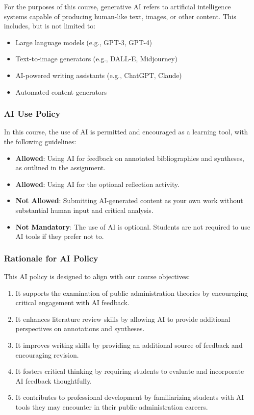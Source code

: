 \documentclass[12pt, letterpaper]{article}
\begin{document}
\noindent For the purposes of this course, generative AI refers to artificial intelligence systems capable of producing human-like text, images, or other content. This includes, but is not limited to:

\begin{itemize}
    \item Large language models (e.g., GPT-3, GPT-4)
    \item Text-to-image generators (e.g., DALL-E, Midjourney)
    \item AI-powered writing assistants (e.g., ChatGPT, Claude)
    \item Automated content generators
\end{itemize}

\subsubsection*{AI Use Policy}

In this course, the use of AI is permitted and encouraged as a learning tool, with the following guidelines:

\begin{itemize}
    \item \textbf{Allowed}: Using AI for feedback on annotated bibliographies and syntheses, as outlined in the assignment.
    \item \textbf{Allowed}: Using AI for the optional reflection activity.
    \item \textbf{Not Allowed}: Submitting AI-generated content as your own work without substantial human input and critical analysis.
    \item \textbf{Not Mandatory}: The use of AI is optional. Students are not required to use AI tools if they prefer not to.
\end{itemize}

\subsubsection*{Rationale for AI Policy}

This AI policy is designed to align with our course objectives:

\begin{enumerate}
    \item It supports the examination of public administration theories by encouraging critical engagement with AI feedback.
    \item It enhances literature review skills by allowing AI to provide additional perspectives on annotations and syntheses.
    \item It improves writing skills by providing an additional source of feedback and encouraging revision.
    \item It fosters critical thinking by requiring students to evaluate and incorporate AI feedback thoughtfully.
    \item It contributes to professional development by familiarizing students with AI tools they may encounter in their public administration careers.
\end{enumerate}
\end{document}
